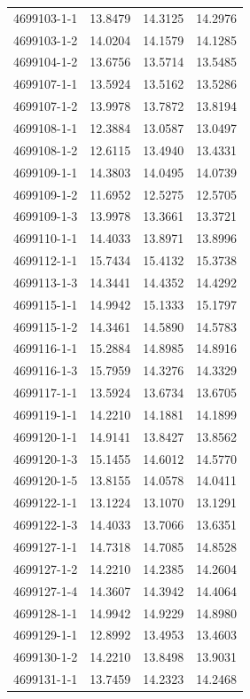 \begin{longtable}{lrrr}
4699103-1-1 & 13.8479 & 14.3125 & 14.2976 \\
4699103-1-2 & 14.0204 & 14.1579 & 14.1285 \\
4699104-1-2 & 13.6756 & 13.5714 & 13.5485 \\
4699107-1-1 & 13.5924 & 13.5162 & 13.5286 \\
4699107-1-2 & 13.9978 & 13.7872 & 13.8194 \\
4699108-1-1 & 12.3884 & 13.0587 & 13.0497 \\
4699108-1-2 & 12.6115 & 13.4940 & 13.4331 \\
4699109-1-1 & 14.3803 & 14.0495 & 14.0739 \\
4699109-1-2 & 11.6952 & 12.5275 & 12.5705 \\
4699109-1-3 & 13.9978 & 13.3661 & 13.3721 \\
4699110-1-1 & 14.4033 & 13.8971 & 13.8996 \\
4699112-1-1 & 15.7434 & 15.4132 & 15.3738 \\
4699113-1-3 & 14.3441 & 14.4352 & 14.4292 \\
4699115-1-1 & 14.9942 & 15.1333 & 15.1797 \\
4699115-1-2 & 14.3461 & 14.5890 & 14.5783 \\
4699116-1-1 & 15.2884 & 14.8985 & 14.8916 \\
4699116-1-3 & 15.7959 & 14.3276 & 14.3329 \\
4699117-1-1 & 13.5924 & 13.6734 & 13.6705 \\
4699119-1-1 & 14.2210 & 14.1881 & 14.1899 \\
4699120-1-1 & 14.9141 & 13.8427 & 13.8562 \\
4699120-1-3 & 15.1455 & 14.6012 & 14.5770 \\
4699120-1-5 & 13.8155 & 14.0578 & 14.0411 \\
4699122-1-1 & 13.1224 & 13.1070 & 13.1291 \\
4699122-1-3 & 14.4033 & 13.7066 & 13.6351 \\
4699127-1-1 & 14.7318 & 14.7085 & 14.8528 \\
4699127-1-2 & 14.2210 & 14.2385 & 14.2604 \\
4699127-1-4 & 14.3607 & 14.3942 & 14.4064 \\
4699128-1-1 & 14.9942 & 14.9229 & 14.8980 \\
4699129-1-1 & 12.8992 & 13.4953 & 13.4603 \\
4699130-1-2 & 14.2210 & 13.8498 & 13.9031 \\
4699131-1-1 & 13.7459 & 14.2323 & 14.2468 \\

\end{longtable}
